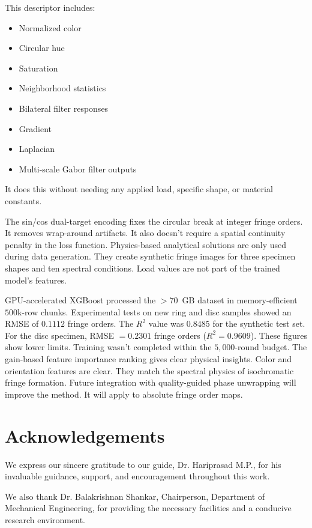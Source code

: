 \documentclass[review,12pt]{elsarticle}
\begin{document}
This descriptor includes:

\begin{itemize}
\item Normalized color
\item Circular hue
\item Saturation
\item Neighborhood statistics
\item Bilateral filter responses
\item Gradient
\item Laplacian
\item Multi-scale Gabor filter outputs
\end{itemize}

It does this without needing any applied load, specific shape, or material constants.

The sin/cos dual-target encoding fixes the circular break at integer fringe orders. It removes wrap-around artifacts. It also doesn't require a spatial continuity penalty in the loss function. Physics-based analytical solutions are only used during data generation. They create synthetic fringe images for three specimen shapes and ten spectral conditions. Load values are not part of the trained model's features.

GPU-accelerated XGBoost processed the ${>}70$~GB dataset in memory-efficient $500$k-row chunks. Experimental tests on new ring and disc samples showed an RMSE of $0.1112$ fringe orders. The $R^2$ value was $0.8485$ for the synthetic test set. For the disc specimen, RMSE $= 0.2301$ fringe orders ($R^2 = 0.9609$). These figures show lower limits. Training wasn't completed within the $5{,}000$-round budget. The gain-based feature importance ranking gives clear physical insights. Color and orientation features are clear. They match the spectral physics of isochromatic fringe formation. Future integration with quality-guided phase unwrapping will improve the method. It will apply to absolute fringe order maps.

\section*{Acknowledgements}

We express our sincere gratitude to our guide, Dr. Hariprasad M.P., for his invaluable guidance, support, and encouragement throughout this work.

We also thank Dr. Balakrishnan Shankar, Chairperson, Department of Mechanical Engineering, for providing the necessary facilities and a conducive research environment.
\end{document}
